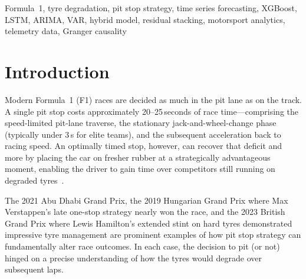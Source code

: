 \documentclass[journal,twoside]{IEEEtran}
\begin{document}
\begin{abstract}
The framework is deployed as an interactive Streamlit dashboard enabling
race engineers to generate real-time strategy recommendations with
driver-specific degradation profiles, configurable pit thresholds, and
multi-strategy comparison.  The full pipeline---from telemetry ingestion
through feature engineering, model training, and strategy
recommendation---is released as open-source software.  Compared with
existing literature that typically models degradation for a single
compound, circuit, or season, our multi-compound, multi-circuit,
multi-season, five-model benchmark provides the most comprehensive
publicly available evaluation of F1 tyre degradation forecasting to
date.
\end{abstract}

\begin{IEEEkeywords}
Formula~1, tyre degradation, pit stop strategy, time series forecasting,
XGBoost, LSTM, ARIMA, VAR, hybrid model, residual stacking, motorsport
analytics, telemetry data, Granger causality
\end{IEEEkeywords}

\section{Introduction}\label{sec:intro}

Modern Formula~1 (F1) races are decided as much in the pit lane as on
the track.  A single pit stop costs approximately 20--25\,seconds of
race time---comprising the speed-limited pit-lane traverse, the
stationary jack-and-wheel-change phase (typically under 3\,s for elite
teams), and the subsequent acceleration back to racing speed.  An
optimally timed stop, however, can recover that deficit and more by
placing the car on fresher rubber at a strategically advantageous
moment, enabling the driver to gain time over competitors still running
on degraded tyres~\cite{heilmeier2020race}.

The 2021 Abu Dhabi Grand Prix, the 2019 Hungarian Grand Prix where Max
Verstappen's late one-stop strategy nearly won the race, and the 2023
British Grand Prix where Lewis Hamilton's extended stint on hard tyres
demonstrated impressive tyre management are prominent examples of how
pit stop strategy can fundamentally alter race outcomes.  In each case,
the decision to pit (or not) hinged on a precise understanding of how
the tyres would degrade over subsequent laps.
\end{document}
